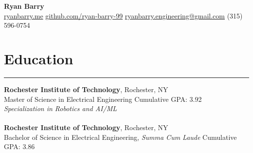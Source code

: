 \documentclass[letterpaper,10pt]{article}
\newcommand{\heading}[1]{%
    \vspace{-5mm} %
    \section*{#1}%
    \vspace{-3mm}%
    \noindent\hrule height 0.5pt %
    \vspace{4mm}%
}
\begin{document}
\begin{center}
    \vspace{-5mm} 
    \textbf{\huge Ryan Barry} \\
    \vspace{1mm}
    \href{http://ryanbarry.me}{ryanbarry.me}
    \hspace{0.2em} \vline \hspace{0.2em}
    \vspace{1mm}
    \href{http://github.com/ryan-barry-99}{github.com/ryan-barry-99}
    \hspace{0.2em} \vline \hspace{0.2em}
    \href{mailto:ryanbarry.engineering@gmail.com}{ryanbarry.engineering@gmail.com}
    \hspace{0.2em} \vline \hspace{0.2em}
    (315) 596-0754
\end{center}

\vspace{-3mm} %

\vspace{-0.5em}
\heading{Education}
\vspace{-1mm}%
\noindent\textbf{Rochester Institute of Technology}, Rochester, NY \\
Master of Science in Electrical Engineering \hfill Cumulative GPA: 3.92 \\
\textit{Specialization in Robotics and AI/ML} \\ \\
\noindent\textbf{Rochester Institute of Technology}, Rochester, NY \\
Bachelor of Science in Electrical Engineering, \textit{Summa Cum Laude} \hfill Cumulative GPA: 3.86 \\ 



\end{document}
